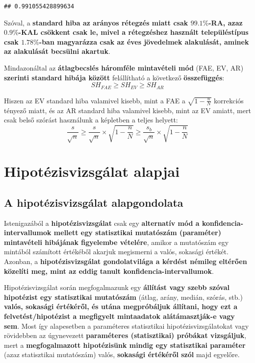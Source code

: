 \documentclass[
]{book}
\begin{document}
\begin{verbatim}
## 0.991055428899634
\end{verbatim}

Szóval, a \textbf{standard hiba az arányos rétegzés miatt csak \(99.1\%\)-RA, azaz \(0.9\%\)-KAL csökkent csak le, mivel a rétegzéshez használt településtípus csak \(1.78\%\)-ban magyarázza csak az éves jövedelmek alakulását, aminek az alakulását becsülni akartuk}.

Mindazonáltal az \textbf{átlagbecslés háromféle mintavételi mód} (FAE, EV, AR) \textbf{szerinti standard hibája között} felállítható a következő \textbf{összefüggés}: \[SH_{FAE} \geq SH_{EV} \geq SH_{AR}\]

Hiszen az EV standard hiba valamivel kisebb, mint a FAE a \(\sqrt{1-\frac{n}{N}}\) korrekciós tényező miatt, és az AR standard hiba valamivel kisebb, mint az EV amiatt, mert csak belső szórást használunk a képletben a teljes helyett: \[\frac{s}{\sqrt{n}} \geq \frac{s}{\sqrt{n}} \times \sqrt{1-\frac{n}{N}} \geq \frac{s_b}{\sqrt{n}} \times \sqrt{1-\frac{n}{N}}\]

\chapter{Hipotézisvizsgálat alapjai}\label{hipotuxe9zisvizsguxe1lat-alapjai}

\section{A hipotézisvizsgálat alapgondolata}\label{a-hipotuxe9zisvizsguxe1lat-alapgondolata}

Istenigazából a \textbf{hipotézisvizsgálat} csak egy \textbf{alternatív mód a konfidencia-intervallumok mellett egy statisztikai mutatószám (paraméter) mintavételi hibájának figyelembe vételére}, amikor a mutatószám egy mintából számított értékéből akarjuk megismerni a valós, sokasági értékét. Azonban, a \textbf{hipotézisvizsgálat gondolatvilága a kérdést némileg eltérően közelíti meg, mint az eddig tanult konfidencia-intervallumok}.

Hipotézisvizsgálat során megfogalmazunk egy \textbf{állítást vagy szebb szóval hipotézist egy statisztikai mutatószám} (átlag, arány, medián, szórás, stb.) \textbf{valós, sokasági értékéről, és utána megpróbáljuk állítani, hogy ezt a felvetést/hipotézist a megfigyelt mintaadatok alátámasztják-e vagy sem}. Most így alapesetben a paraméteres statisztikai hipotézisvizsgálatokat vagy rövidebben az úgynevezett \textbf{paraméteres (statisztikai) próbákat vizsgáljuk}, mert a \textbf{megfogalmazott hipotézisünk mindig egy statisztikai paraméter} (azaz statisztikai mutatószám) valós, \textbf{sokasági értékéről szól} majd egyelőre.
\end{document}

